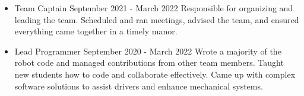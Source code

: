 \documentclass[10pt,a4paper,ragged2e,withhyper]{altacv}
\begin{document}
\begin{paracol}{2}
    \begin{itemize}
    \item {{\color{emphasis}Team Captain} {{\color{accent}\faCalendar}\color{emphasis} September 2021 - March 2022}
        \newline
        \smallskip
        Responsible for organizing and \newline leading the team. Scheduled and \newline ran meetings, advised the team, and \newline ensured everything came together in a timely manor.}
    \newline
    \divider
    \newline
    \item {{\color{emphasis}Lead Programmer} {\color{accent}\faCalendar\color{emphasis} September 2020 - March 2022}
        \newline
        \smallskip
        Wrote a majority of the robot \newline code and managed contributions from other team members. Taught new students how to code and \newline collaborate effectively. Came up with complex software solutions \newline to assist drivers and enhance \newline mechanical systems.}
    \end{itemize}
        
    \end{paracol}
\end{document}
